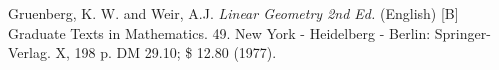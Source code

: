 \documentclass[12pt]{article}
\begin{document}

\providecommand{\bysame}{\leavevmode\hbox to3em{\hrulefill}\thinspace}
\providecommand{\MR}{\relax\ifhmode\unskip\space\fi MR }
\providecommand{\MRhref}[2]{%
\href{http://www.ams.org/mathscinet-getitem?mr=#1}{#2}
}
\providecommand{\href}[2]{#2}
\begin{thebibliography}{10}


Gruenberg, K. W. and Weir, A.J.
\emph{Linear Geometry 2nd Ed.} (English)
[B] Graduate Texts in Mathematics. 49. New York - Heidelberg - Berlin: Springer-Verlag. X, 198 p. DM 29.10; \$ 12.80 (1977).

\end{thebibliography}

\end{document}
